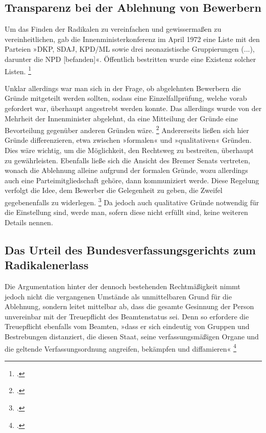 \documentclass[12pt]{scrartcl}
\begin{document}
\subsection{Transparenz bei der Ablehnung von Bewerbern}

Um das Finden der Radikalen zu vereinfachen und gewissermaßen zu vereinheitlichen, gab die Innenministerkonferenz im April 1972 eine Liste mit den Parteien »DKP, SDAJ, KPD/ML sowie drei neonazistische Gruppierungen (...), darunter die NPD [befanden]«. Öffentlich bestritten wurde eine Existenz solcher Listen. \footcite[][S. 346]{rigoll_staatsschutz_2013} 

Unklar allerdings war man sich in der Frage, ob abgelehnten Bewerbern die Gründe mitgeteilt werden sollten, sodass eine Einzelfallprüfung, welche vorab gefordert war, überhaupt angestrebt werden konnte. Das allerdings wurde von der Mehrheit der Innenminister abgelehnt, da eine Mitteilung der Gründe eine Bevorteilung gegenüber anderen Gründen wäre. \footcite[][S. 346]{rigoll_staatsschutz_2013} Andererseits ließen sich hier Gründe differenzieren, etwa zwischen »formalen« und »qualitativen« Gründen. Dies wäre wichtig, um die Möglichkeit, den Rechtsweg zu bestreiten, überhaupt zu gewährleisten. Ebenfalls ließe sich die Ansicht des Bremer Senats vertreten, wonach die Ablehnung alleine aufgrund der formalen Gründe, wozu allerdings auch eine Parteimitgliedschaft gehöre, dann kommuniziert werde. Diese Regelung verfolgt die Idee, dem Bewerber die Gelegenheit zu geben, die Zweifel gegebenenfalls zu widerlegen. \footcite[][S. 346]{rigoll_staatsschutz_2013} Da jedoch auch qualitative Gründe notwendig für die Einstellung sind, werde man, sofern diese nicht erfüllt sind, keine weiteren Details nennen.

\subsection{Das Urteil des Bundesverfassungsgerichts zum Radikalenerlass}

Die Argumentation hinter der dennoch bestehenden Rechtmäßigkeit nimmt jedoch nicht die vergangenen Umstände als unmittelbaren Grund für die Ablehnung, sondern leitet mittelbar ab, dass die gesamte Gesinnung der Person unvereinbar mit der Treuepflicht des Beamtenstatus sei. Denn so erfordere die Treuepflicht ebenfalls vom Beamten, »dass er sich eindeutig von Gruppen und Bestrebungen distanziert, die diesen Staat, seine verfassungsmäßigen Organe und die geltende Verfassungsordnung angreifen, bekämpfen und diffamieren« \footcite[][Abs. 2]{noauthor_bverfge_nodate}
\end{document}

